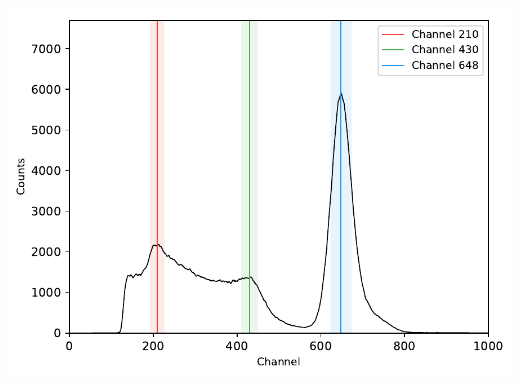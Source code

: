 %
\begin{center}
    \begin{adjustbox}{max width=\linewidth, keepaspectratio}
        \includegraphics[]{pdf/137Cs}
    \end{adjustbox}
    \label{fig:137CsDecayScheme}
\end{center}
%
